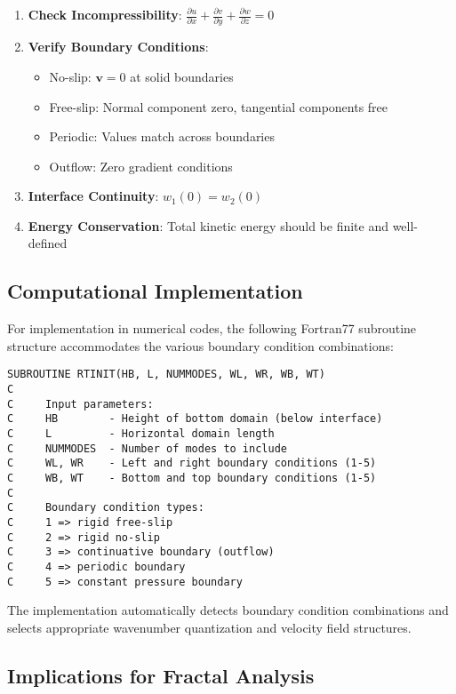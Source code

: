 \documentclass[12pt,a4paper]{article}
\begin{document}
\begin{enumerate}
    \item \textbf{Check Incompressibility}: $\frac{\partial u}{\partial x} + \frac{\partial v}{\partial y} + \frac{\partial w}{\partial z} = 0$
    \item \textbf{Verify Boundary Conditions}: 
        \begin{itemize}
            \item No-slip: $\mathbf{v} = 0$ at solid boundaries
            \item Free-slip: Normal component zero, tangential components free
            \item Periodic: Values match across boundaries
            \item Outflow: Zero gradient conditions
        \end{itemize}
    \item \textbf{Interface Continuity}: $w_1(0) = w_2(0)$
    \item \textbf{Energy Conservation}: Total kinetic energy should be finite and well-defined
\end{enumerate}

\subsection{Computational Implementation}

For implementation in numerical codes, the following Fortran77 subroutine structure accommodates the various boundary condition combinations:

\begin{lstlisting}
SUBROUTINE RTINIT(HB, L, NUMMODES, WL, WR, WB, WT)
C     
C     Input parameters:
C     HB        - Height of bottom domain (below interface)
C     L         - Horizontal domain length  
C     NUMMODES  - Number of modes to include
C     WL, WR    - Left and right boundary conditions (1-5)
C     WB, WT    - Bottom and top boundary conditions (1-5)
C
C     Boundary condition types:
C     1 => rigid free-slip
C     2 => rigid no-slip
C     3 => continuative boundary (outflow) 
C     4 => periodic boundary
C     5 => constant pressure boundary
\end{lstlisting}

The implementation automatically detects boundary condition combinations and selects appropriate wavenumber quantization and velocity field structures.

\subsection{Implications for Fractal Analysis}
\end{document}
